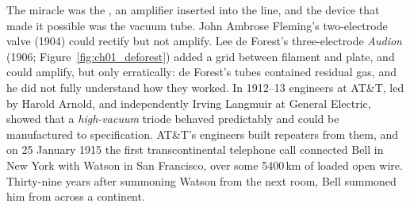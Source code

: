 The miracle was the , an amplifier inserted into the line, and the device that made it
possible was the vacuum tube. John Ambrose Fleming's two-electrode valve (1904) could rectify but not
amplify. Lee de Forest's three-electrode \emph{Audion} (1906; Figure~\ref{fig:ch01_deforest}) added a
grid between filament and plate, and could amplify, but only erratically: de Forest's tubes contained
residual gas, and he did not fully understand how they worked. In 1912--13 engineers at AT\&T, led by
Harold Arnold, and independently Irving Langmuir at General Electric, showed that a
\emph{high-vacuum} triode behaved predictably and could be manufactured to specification. AT\&T's
engineers built repeaters from them, and on 25 January 1915 the first transcontinental telephone call
connected Bell in New York with Watson in San Francisco, over some 5400\,km of loaded open wire.
Thirty-nine years after summoning Watson from the next room, Bell summoned him from across a
continent.


